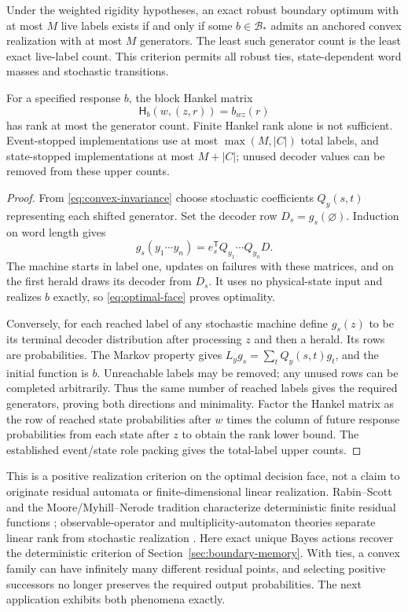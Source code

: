 \begin{theorem}\label{thm:convex-memory}
Under the weighted rigidity hypotheses, an exact robust boundary optimum with at most $M$ live labels exists if and only if some $b\in\mathcal B_*$ admits an anchored convex realization with at most $M$ generators. The least such generator count is the least exact live-label count. This criterion permits all robust ties, state-dependent word masses and stochastic transitions.

For a specified response $b$, the block Hankel matrix
\[
 \mathsf H_b(w,(z,r))=b_{wz}(r)
\]
has rank at most the generator count. Finite Hankel rank alone is not sufficient. Event-stopped implementations use at most $\max(M,|C|)$ total labels, and state-stopped implementations at most $M+|C|$; unused decoder values can be removed from these upper counts.
\end{theorem}
\begin{proof}
From \eqref{eq:convex-invariance} choose stochastic coefficients $Q_y(s,t)$ representing each shifted generator. Set the decoder row $D_s=g_s(\varnothing)$. Induction on word length gives
\[
 g_s(y_1\cdots y_n)=e_s^{\mathsf T}Q_{y_1}\cdots Q_{y_n}D.
\]
The machine starts in label one, updates on failures with these matrices, and on the first herald draws its decoder from $D_s$. It uses no physical-state input and realizes $b$ exactly, so \eqref{eq:optimal-face} proves optimality.

Conversely, for each reached label of any stochastic machine define $g_s(z)$ to be its terminal decoder distribution after processing $z$ and then a herald. Its rows are probabilities. The Markov property gives $L_yg_s=\sum_tQ_y(s,t)g_t$, and the initial function is $b$. Unreachable labels may be removed; any unused rows can be completed arbitrarily. Thus the same number of reached labels gives the required generators, proving both directions and minimality. Factor the Hankel matrix as the row of reached state probabilities after $w$ times the column of future response probabilities from each state after $z$ to obtain the rank lower bound. The established event/state role packing gives the total-label upper counts.
\end{proof}

This is a positive realization criterion on the optimal decision face, not a claim to originate residual automata or finite-dimensional linear realization. Rabin--Scott and the Moore/Myhill--Nerode tradition characterize deterministic finite residual functions \cite{RabinScott59}; observable-operator and multiplicity-automaton theories separate linear rank from stochastic realization \cite{Jaeger00,ThonJaeger15}. Here exact unique Bayes actions recover the deterministic criterion of Section~\ref{sec:boundary-memory}. With ties, a convex family can have infinitely many different residual points, and selecting positive successors no longer preserves the required output probabilities. The next application exhibits both phenomena exactly.

